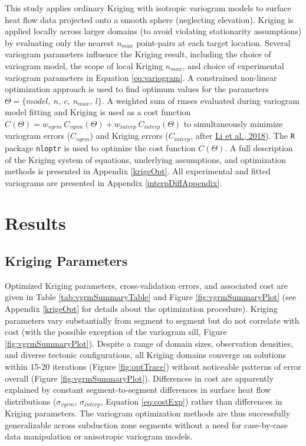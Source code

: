 This study applies ordinary Kriging with isotropic variogram models to surface heat flow data projected onto a smooth sphere (neglecting elevation). Kriging is applied locally across larger domains (to avoid violating stationarity assumptions) by evaluating only the nearest \(n_{max}\) point-pairs at each target location. Several variogram parameters influence the Kriging result, including the choice of variogram model, the scope of local Kriging \(n_{max}\), and choice of experimental variogram parameters in Equation \eqref{eq:variogram}. A constrained non-linear optimization approach is used to find optimum values for the parameters \(\Theta = \{model,\ n,\ c,\ n_{max},\ l\}\). A weighted sum of \glspl{rmse} evaluated during variogram model fitting and Kriging is used as a cost function \(C(\Theta) = w_{vgrm}\ C_{vgrm}(\Theta) + w_{interp}\ C_{interp}(\Theta)\) to simultaneously minimize variogram errors (\(C_{vgrm}\)) and Kriging errors (\(C_{interp}\), after \protect\hyperlink{ref-li2018}{Li et al., 2018}). The \texttt{R} package \texttt{nloptr} is used to optimize the cost function \(C(\Theta)\). A full description of the Kriging system of equations, underlying assumptions, and optimization methods is presented in Appendix \ref{krigeOpt}. All experimental and fitted variograms are presented in Appendix \ref{interpDiffAppendix}.

\hypertarget{chpt3Results}{%
\section{Results}\label{chpt3Results}}

\hypertarget{kriging-parameters}{%
\subsection{Kriging Parameters}\label{kriging-parameters}}

Optimized Kriging parameters, cross-validation errors, and associated cost are given in Table \ref{tab:vgrmSummaryTable} and Figure \ref{fig:vgrmSummaryPlot} (see Appendix \ref{krigeOpt} for details about the optimization procedure). Kriging parameters vary substantially from segment to segment but do not correlate with cost (with the possible exception of the variogram sill, Figure \ref{fig:vgrmSummaryPlot}). Despite a range of domain sizes, observation densities, and diverse tectonic configurations, all Kriging domains converge on solutions within 15-20 iterations (Figure \ref{fig:optTrace}) without noticeable patterns of error overall (Figure \ref{fig:vgrmSummaryPlot}). Differences in cost are apparently explained by constant segment-to-segment differences in surface heat flow distributions (\(\sigma_{vgrm}\), \(\sigma_{interp}\), Equation \eqref{eq:costExp}) rather than differences in Kriging parameters. The variogram optimization methods are thus successfully generalizable across subduction zone segments without a need for case-by-case data manipulation or anisotropic variogram models.

